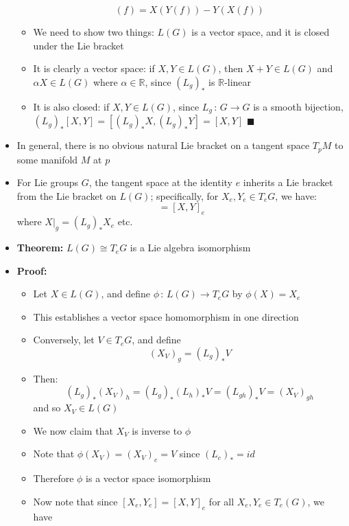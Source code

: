 \documentclass[12pt,a4paper]{article}
\numberwithin{equation}{section}
\begin{document}
\begin{itemize}
\begin{itemize}
\begin{equation}
				[X,Y](f)=X(Y(f))-Y(X(f))
			\end{equation}
			\item We need to show two things: $L(G)$ is a vector space, and it is closed under the Lie bracket
			\item It is clearly a vector space: if $X,Y\in L(G)$, then $X+Y\in L(G)$ and $\alpha X\in L(G)$ where $\alpha\in \mathbb{R}$, since $(L_{g})_{*}$ is $\mathbb{R}$-linear
			\item It is also closed: if $X,Y\in L(G)$, since $L_{g}\,:\,G\to G$ is a smooth bijection, $(L_{g})_{*}[X,Y]=[(L_{g})_{*}X,(L_{g})_{*}Y]=[X,Y]$ $\blacksquare$ 
		\end{itemize}
		\item In general, there is no obvious natural Lie bracket on a tangent space $T_{p}M$ to some manifold $M$ at $p$
		\item For Lie groups $G$, the tangent space at the identity $e$ inherits a Lie bracket from the Lie bracket on $L(G)$; specifically, for $X_{e},Y_{e}\in T_{e}G$, we have:
		\begin{equation}
			[X_{e},Y_{e}]=[X,Y]_{e}
		\end{equation}
		where $X\rvert_{g}=(L_{g})_{*}X_{e}$ etc.
		\item \textbf{Theorem:} $L(G)\cong T_{e}G$ is a Lie algebra isomorphism
		\item \textbf{Proof:}
		\begin{itemize}
			\item Let $X\in L(G)$, and define $\phi\,:\,L(G)\to T_{e}G$ by $\phi(X)=X_{e}$
			\item This establishes a vector space homomorphism in one direction
			\item Conversely, let $V\in T_{e}G$, and define
			\begin{equation}
				(X_{V})_{g}=(L_{g})_{*}V
			\end{equation}
			\item Then:
			\begin{equation}
				(L_{g})_{*}(X_{V})_{h}=(L_{g})_{*}(L_{h})_{*}V=(L_{gh})_{*}V=(X_{V})_{gh}
			\end{equation}
			and so $X_{V}\in L(G)$
			\item We now claim that $X_{V}$ is inverse to $\phi$
			\item Note that $\phi(X_{V})=(X_{V})_{e}=V$ since $(L_{e})_{*}=id$
			\item Therefore $\phi$ is a vector space isomorphism
			\item Now note that since $[X_{e},Y_{e}]=[X,Y]_{e}$ for all $X_{e},Y_{e}\in T_{e}(G)$, we have

\end{itemize}
\end{itemize}
\end{document}

